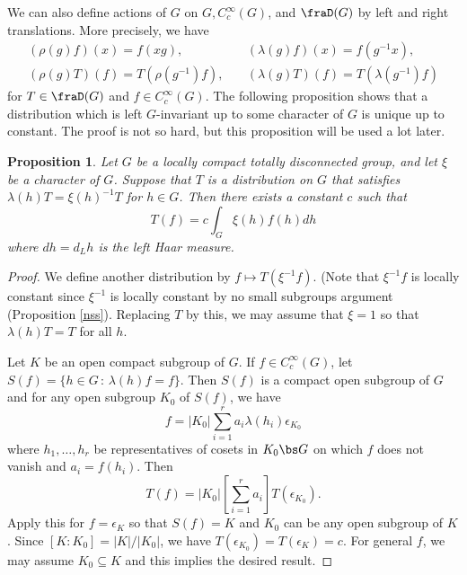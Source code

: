 \documentclass{article}
\newtheorem{proposition}{Proposition}[section]
\begin{document}
We can also define actions of $G$ on $G, C_{c}^{\infty}(G)$, and $\fraD(G)$ by left and right translations. More precisely, we have
\begin{align*}
(\rho(g) f)(x) = f(xg), &\quad (\lambda(g)f)(x) = f(g^{-1}x), \\
(\rho(g)T)(f) = T(\rho(g^{-1})f), &\quad (\lambda(g)T)(f) = T(\lambda(g^{-1})f)
\end{align*}
for $T\in \fraD(G)$ and $f\in C_{c}^{\infty}(G)$. 
The following proposition shows that a distribution which is left $G$-invariant up to some character of $G$  is unique up to constant. The proof is not so hard, but this proposition will be used a lot later. 
\begin{proposition}
\label{distuniq}
Let $G$ be a locally compact totally disconnected group, and let $\xi$ be a character of $G$. Suppose that $T$ is a distribution on $G$ that satisfies $\lambda(h)T = \xi(h)^{-1}T$ for $h\in G$. Then there exists a constant $c$ such that
$$
T(f) = c\int_{G} \xi(h)f(h)dh
$$
where $dh = d_{L}h$ is the left Haar measure. 
\end{proposition}
\begin{proof}
We define another distribution by $f\mapsto T(\xi^{-1}f)$. (Note that $\xi^{-1}f$ is locally constant since $\xi^{-1}$ is locally constant by no small subgroups argument (Proposition \ref{nss}). Replacing $T$ by this, we may assume that $\xi = 1$ so that $\lambda(h)T = T$ for all $h$. 

Let $K$ be an open compact subgroup of $G$. If $f\in C_{c}^{\infty}(G)$, let $S(f) = \{h\in G\,:\, \lambda(h)f = f\}$. 
Then $S(f)$ is a compact open subgroup of $G$ and for any open subgroup $K_0$ of $S(f)$, we have 
$$
f = |K_{0}|\sum_{i=1}^{r} a_{i}\lambda(h_{i})\epsilon_{K_{0}}
$$
where $h_{1}, \dots, h_{r}$ be representatives of cosets in $K_{0}\bs G$ on which $f$ does not vanish and $a_{i} = f(h_{i})$. 
Then 
$$
T(f) = |K_{0}| \left[ \sum_{i=1}^{r}a_{i}\right] T(\epsilon_{K_{0}}).
$$
Apply this for $f = \epsilon_K$ so that $S(f) = K$ and $K_{0}$ can be any open subgroup of $K$. 
Since $[K:K_{0}] = |K|/|K_{0}|$, we have $T(\epsilon_{K_{0}}) = T(\epsilon_K) = c$. 
For general $f$, we may assume $K_{0} \subseteq K$ and this implies the desired result. 
\end{proof}
\end{document}
